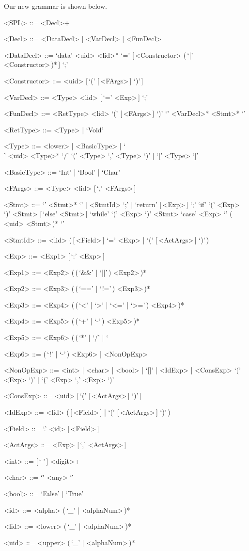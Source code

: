 \documentclass[a4paper]{article}
\begin{document}
Our new grammar is shown below.
\setlength{\grammarindent}{7.6em}
\begin{grammar}
    <SPL> ::= <Decl>+

    <Decl> ::= <DataDecl> | <VarDecl> | <FunDecl>

    <DataDecl> ::= `data' <uid> <lid>* `=' [\,<Constructor> (\,`|' <Constructor>\,)*\,] `;'

    <Constructor> ::= <uid> [\,`(' [\,<FArgs>\,] `)'\,]

    <VarDecl> ::= <Type> <lid> [\,`=' <Exp>\,] `;'

    <FunDecl> ::= <RetType> <lid> `(' [\,<FArgs>\,] `)' `{' <VarDecl>* <Stmt>* `}'

    <RetType> ::= <Type> | `Void'

    <Type> ::= <lower> | <BasicType> | `\\' <uid> <Type>* `/'
    \alt `(' <Type> `,' <Type> `)' | `[' <Type> `]'

    <BasicType> ::= `Int' | `Bool' | `Char'

    <FArgs> ::= <Type> <lid> [\,`,' <FArgs>\,]

    <Stmt> ::= `{' <Stmt>* `}' | <StmtId> `;' | `return' [\,<Exp>\,] `;'
    \alt `if' `(' <Exp> `)' <Stmt> [\,`else' <Stmt>\,]
    \alt `while' `(' <Exp> `)' <Stmt>
    \alt `case' <Exp> `{' (\,<uid> <Stmt>\,)* `}'

    <StmtId> ::= <lid> (\,[\,<Field>\,] `=' <Exp> | `(' [\,<ActArgs>\,] `)'\,)

    <Exp> ::= <Exp1> [\,`:' <Exp>\,]

    <Exp1> ::= <Exp2> (\,(\,`&&' | `||'\,) <Exp2>\,)*

    <Exp2> ::= <Exp3> (\,(\,`==' | `!='\,) <Exp3>\,)*

    <Exp3> ::= <Exp4> (\,(\,`<' | `>' | `<=' | `>='\,) <Exp4>\,)*

    <Exp4> ::= <Exp5> (\,(\,`+' | `-'\,) <Exp5>\,)*

    <Exp5> ::= <Exp6> (\,(\,`*' | `/' | `%

    <Exp6> ::= (\,`!' | `-'\,) <Exp6> | <NonOpExp>

    <NonOpExp> ::= <int> | <char> | <bool> | `[]' | <IdExp> | <ConsExp>
    \alt `(' <Exp> `)' | `(' <Exp> `,' <Exp> `)'

    <ConsExp> ::= <uid> [\,`(' [\,<ActArgs>\,] `)'\,]

    <IdExp> ::= <lid> (\,[\,<Field>\,] | `(' [\,<ActArgs>\,] `)'\,)

    <Field> ::= `.' <id> [\,<Field>\,]

    <ActArgs> ::= <Exp> [\,`,' <ActArgs>\,]

    <int> ::= [\,`-'\,] <digit>+

    <char> ::= `\'' <any> `\''

    <bool> ::= `False' | `True'

    <id> ::= <alpha> (\,`_' | <alphaNum>\,)*

    <lid> ::= <lower> (\,`_' | <alphaNum>\,)*

    <uid> ::= <upper> (\,`_' | <alphaNum>\,)*
\end{grammar}
\end{document}
